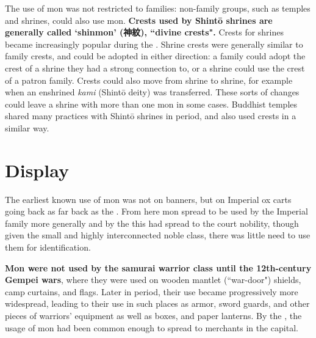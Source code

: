 \documentclass{article}
\begin{document}
  The use of mon was
  not restricted to families: non-family groups, such as temples and
  shrines, could also use mon.
  \textbf{Crests used by Shintō shrines are generally called `shinmon'
  (神紋), ``divine crests".}  Crests for shrines
  became increasingly popular
  during the \KamakuraPeriod.  Shrine crests were generally similar to
  family crests, and could be adopted in either direction: a family
  could adopt the crest of a shrine they had a strong connection to,
  or a shrine could use the crest of a patron family.  Crests could
  also move from shrine to shrine, for example when an enshrined \emph{kami}
  (Shint\=o deity) was transferred.  These sorts of changes could
  leave a shrine with more than one mon in some
  cases. Buddhist temples shared
  many practices with Shintō shrines in period, and also used
  crests in a similar way.

\section{Display}

  The earliest known use of mon was not on banners, but on Imperial ox
  carts going back as far back as the \NaraPeriod.
  From here mon spread to be used by the Imperial family more generally
  and by the \HeianPeriod{} this had spread to the court nobility, 
  though given the small and
  highly interconnected noble class, there was little need to use them
  for identification.

  \textbf{Mon were not used by the samurai warrior class until the
  12th-century Gempei wars}, where they were used on wooden mantlet
  (``war-door") shields, camp curtains, and flags.
   Later in period, their use became progressively more
  widespread, leading to their use in such places as armor, sword guards,
  and other pieces of
  warriors' equipment as well as boxes, and paper lanterns.
  By the \MomoyamaPeriod, the usage of mon had been common enough to
  spread to merchants in the capital.

  \begin{figure}[b!]
  \begin{subfigs}
  \end{subfigs}
  \end{figure}
\end{document}

